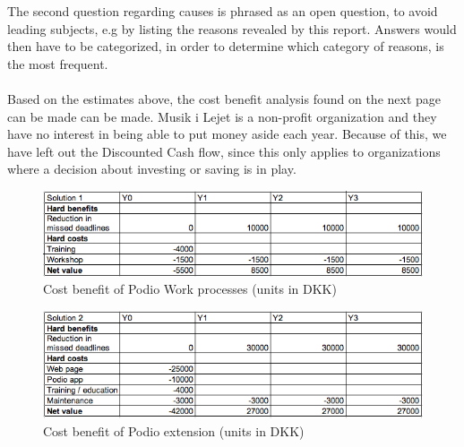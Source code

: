 The second question regarding causes is phrased as an open question, to avoid leading subjects, e.g by listing the reasons revealed by this report. Answers would then have to be categorized, in order to determine which category of reasons, is the most frequent.
\\ \\
Based on the estimates above, the cost benefit analysis found on the next page can be made can be made. Musik i Lejet is a non-profit organization and they have no interest in being able to put money aside each year. Because of this, we have left out the Discounted Cash flow, since this only applies to organizations where a decision about investing or saving is in play.
\newpage
\begin{figure}[h!]
  \centering
\includegraphics[scale=0.6]{Pictures/cost-benefit1.png}
    \caption{Cost benefit of Podio Work processes (units in DKK)}
\end{figure}
\begin{figure}[h!]
  \centering
\includegraphics[scale=0.6]{Pictures/cost-benefit2.png}
    \caption{Cost benefit of Podio extension (units in DKK)}
\end{figure}
